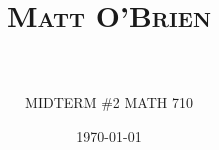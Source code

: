 \documentclass[paper=a4, fontsize=11pt]{scrartcl} %
\title{	
\normalfont \normalsize 
\textsc{Matt O'Brien} \\ [25pt] %
\horrule{0.5pt} \\[0.4cm] %
}
\author{MIDTERM \#2  \text{          }MATH 710}
\date{\normalsize\today} %
\begin{document}
\maketitle %
\begin{comment}
\begin{align*}
\int_E (f \cdot \chi A) &= \int_{E/A} (f \cdot \chi A) + \int_A (f \cdot \chi A) \text{ ,by linearity properties of the integral}.
\\  &= 0  + \int_A (f \cdot \chi A) \text{ , by definition of characteristic function}
\\  &=  \int_A (f \cdot \ 1) \text{ , by definition of characteristic function}
\end{align*} 
ok here is the cheetshee for piecewise functions
$$
f(n) =
\begin{cases}
n/2, & \text{if }n\text{ is even} \\
3n+1, & \text{if }n\text{ is odd}
\end{cases}
$$
\end{comment}	

\end{document}
